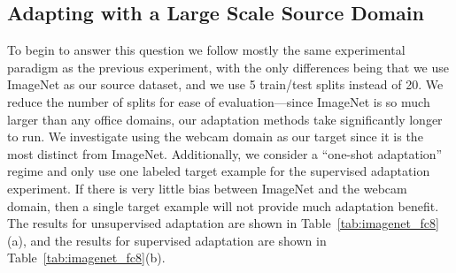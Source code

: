 




\subsection{Adapting with a Large Scale Source Domain}

To begin to answer this question we follow mostly the same experimental paradigm as the previous experiment, with the only differences being that we use ImageNet as our source dataset, and we use 5 train/test splits instead of 20.
We reduce the number of splits for ease of evaluation---since ImageNet is so much larger than any office domains, our adaptation methods take significantly longer to run.
We investigate using the webcam domain as our target since it is the most distinct from ImageNet. 
Additionally, we consider a ``one-shot adaptation'' regime and only use one labeled target example for the supervised adaptation experiment. If there is very little bias between ImageNet and the webcam domain, then a single target example will not provide much adaptation benefit.
The results for unsupervised adaptation are shown in Table~\ref{tab:imagenet_fc8}(a), and the results for supervised adaptation are shown in Table~\ref{tab:imagenet_fc8}(b). %


